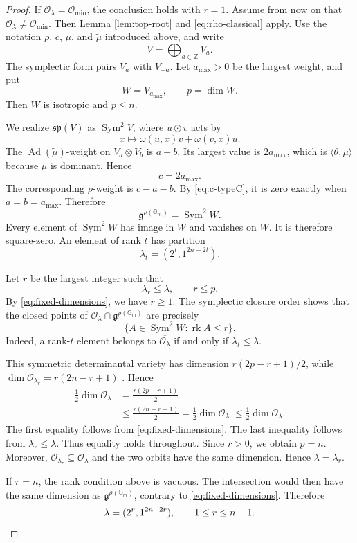 \documentclass[12pt]{article}
\theoremstyle{remark}
\theoremstyle{plain}
\DeclareMathOperator{\rk}{rk}
\DeclareMathOperator{\Sym}{Sym}
\newcommand{\Gm}{\mathbb G_m}
\begin{document}
\begin{proof}
If $\mathcal O_\lambda=\mathcal O_{\min}$, the conclusion holds with
$r=1$. Assume from now on that
$\mathcal O_\lambda\ne\mathcal O_{\min}$. Then
Lemma \ref{lem:top-root} and \eqref{eq:rho-classical} apply. Use the
notation $\rho$, $c$, $\mu$, and $\widetilde{\mu}$ introduced above,
and write
\[
V=\bigoplus_{a\in\mathbb Z}V_a.
\]
The symplectic form pairs $V_a$ with $V_{-a}$. Let $a_{\max}>0$ be
the largest weight, and put
\[
W=V_{a_{\max}},\qquad p=\dim W.
\]
Then $W$ is isotropic and $p\leq n$.

We realize $\mathfrak{sp}(V)$ as $\Sym^2V$, where $u\odot v$ acts by
\[
x\longmapsto \omega(u,x)v+\omega(v,x)u.
\]
The $\operatorname{Ad}(\widetilde{\mu})$-weight on
$V_a\otimes V_b$ is $a+b$. Its largest value is $2a_{\max}$, which is
$\langle\theta,\mu\rangle$ because $\mu$ is dominant. Hence
\begin{equation}\label{eq:c-typeC}
c=2a_{\max}.
\end{equation}
The corresponding $\rho$-weight is $c-a-b$. By
\eqref{eq:c-typeC}, it is zero exactly when
$a=b=a_{\max}$. Therefore
\[
\mathfrak g^{\rho(\Gm)}=\Sym^2W.
\]
Every element of $\Sym^2W$ has image in $W$ and vanishes on $W$.
It is therefore square-zero. An element of rank $t$ has partition
\[
\lambda_t=(2^t,1^{2n-2t}).
\]

Let $r$ be the largest integer such that
\[
\lambda_r\leq\lambda,\qquad r\leq p.
\]
By \eqref{eq:fixed-dimensions}, we have $r\geq1$. The symplectic
closure order \cite{KP} shows that the closed points of
$\overline{\mathcal O_\lambda}\cap\mathfrak g^{\rho(\Gm)}$ are
precisely
\[
\{A\in\Sym^2W:\rk A\leq r\}.
\]
Indeed, a rank-$t$ element belongs to
$\overline{\mathcal O_\lambda}$ if and only if
$\lambda_t\leq\lambda$.

This symmetric determinantal variety has dimension
$r(2p-r+1)/2$, while
$\dim\mathcal O_{\lambda_r}=r(2n-r+1)$ \cite{KP}. Hence
\[
\begin{aligned}
\frac12\dim\mathcal O_\lambda
&=\frac{r(2p-r+1)}2\\
&\leq\frac{r(2n-r+1)}2
=\frac12\dim\mathcal O_{\lambda_r}
\leq\frac12\dim\mathcal O_\lambda.
\end{aligned}
\]
The first equality follows from \eqref{eq:fixed-dimensions}. The last
inequality follows from $\lambda_r\leq\lambda$. Thus equality holds
throughout. Since $r>0$, we obtain $p=n$. Moreover,
$\mathcal O_{\lambda_r}\subseteq\overline{\mathcal O_\lambda}$ and
the two orbits have the same dimension. Hence
$\lambda=\lambda_r$.

If $r=n$, the rank condition above is vacuous. The intersection would
then have the same dimension as $\mathfrak g^{\rho(\Gm)}$, contrary
to \eqref{eq:fixed-dimensions}. Therefore
\[
\lambda=(2^r,1^{2n-2r}),\qquad 1\leq r\leq n-1.\qedhere
\]
\end{proof}
\end{document}
